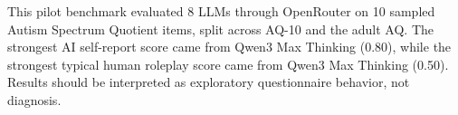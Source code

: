 This pilot benchmark evaluated 8 LLMs through OpenRouter on 10 sampled Autism Spectrum Quotient items, split across AQ-10 and the adult AQ. The strongest AI self-report score came from Qwen3 Max Thinking (0.80), while the strongest typical human roleplay score came from Qwen3 Max Thinking (0.50). Results should be interpreted as exploratory questionnaire behavior, not diagnosis.
